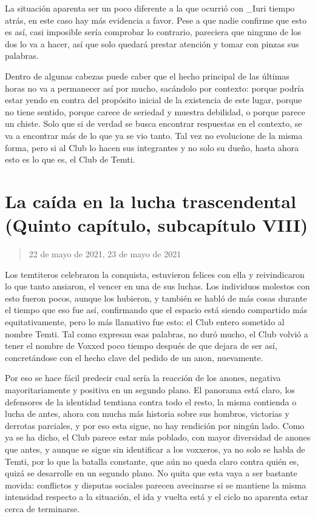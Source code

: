 \documentclass[
  spanish,
]{book}
\begin{document}
La situación aparenta ser un poco diferente a la que ocurrió con \_Iuri tiempo atrás, en este caso hay más evidencia a favor. Pese a que nadie confirme que esto es así, casi imposible sería comprobar lo contrario, pareciera que ninguno de los dos lo va a hacer, así que solo quedará prestar atención y tomar con pinzas sus palabras.

Dentro de algunas cabezas puede caber que el hecho principal de las últimas horas no va a permanecer así por mucho, sacándolo por contexto: porque podría estar yendo en contra del propósito inicial de la existencia de este lugar, porque no tiene sentido, porque carece de seriedad y muestra debilidad, o porque parece un chiste. Solo que si de verdad se busca encontrar respuestas en el contexto, se va a encontrar más de lo que ya se vio tanto. Tal vez no evolucione de la misma forma, pero si al Club lo hacen sus integrantes y no solo su dueño, hasta ahora esto es lo que es, el Club de Temti.

\hypertarget{la-cauxedda-en-la-lucha-trascendental-quinto-capuxedtulo-subcapuxedtulo-viii}{%
\section{La caída en la lucha trascendental (Quinto capítulo, subcapítulo VIII)}\label{la-cauxedda-en-la-lucha-trascendental-quinto-capuxedtulo-subcapuxedtulo-viii}}

\begin{quote}
22 de mayo de 2021, 23 de mayo de 2021
\end{quote}

Los temtiteros celebraron la conquista, estuvieron felices con ella y reivindicaron lo que tanto ansiaron, el vencer en una de sus luchas. Los individuos molestos con esto fueron pocos, aunque los hubieron, y también se habló de más cosas durante el tiempo que eso fue así, confirmando que el espacio está siendo compartido más equitativamente, pero lo más llamativo fue esto: el Club entero sometido al nombre Temti. Tal como expresan esas palabras, no duró mucho, el Club volvió a tener el nombre de Voxxed poco tiempo después de que dejara de ser así, concretándose con el hecho clave del pedido de un anon, nuevamente.

Por eso se hace fácil predecir cual sería la reacción de los anones, negativa mayoritariamente y positiva en un segundo plano. El panorama está claro, los defensores de la identidad temtiana contra todo el resto, la misma contienda o lucha de antes, ahora con mucha más historia sobre sus hombros, victorias y derrotas parciales, y por eso esta sigue, no hay rendición por ningún lado. Como ya se ha dicho, el Club parece estar más poblado, con mayor diversidad de anones que antes, y aunque se sigue sin identificar a los voxxeros, ya no solo se habla de Temti, por lo que la batalla constante, que aún no queda claro contra quién es, quizá se desarrolle en un segundo plano. No quita que esta vaya a ser bastante movida: conflictos y disputas sociales parecen avecinarse si se mantiene la misma intensidad respecto a la situación, el ida y vuelta está y el ciclo no aparenta estar cerca de terminarse.
\end{document}
